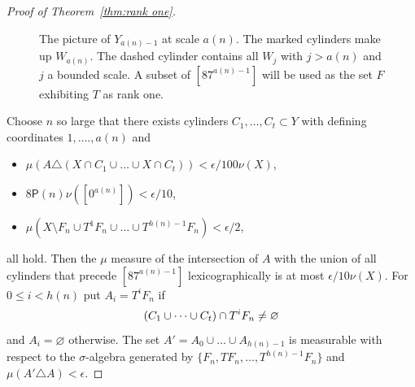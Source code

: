 \documentclass[AHL,Unicode,longabstracts,published]{cedram}
\renewcommand{\P}{\mathsf{P}}
\renewcommand{\emptyset}{\varnothing}
\let\originalleft\left
\let\originalright\right
\renewcommand{\left}{\mathopen{}\mathclose\bgroup\originalleft}
\renewcommand{\right}{\aftergroup\egroup\originalright}
\begin{document}
\begin{proof}[Proof of Theorem~\ref{thm:rank one}]
\begin{figure}[!h]
\caption{The picture of $Y_{a(n)-1}$ at scale $a(n)$. The marked cylinders make up $W_{a(n)}$. The dashed cylinder contains all $W_j$ with $j > a(n)$ and $j$ a bounded scale. A subset of $[87^{a(n)-1}]$ will be used as the set $F$ exhibiting $T$ as rank one.}\label{fig:rank_one}
\end{figure}

\pagebreak
Choose $n$ so large that there exists cylinders $C_1,\dots,C_t\subset Y$ with defining coordinates $1,\dots.,a(n)$ and
\begin{itemize}
\item $\mu (A \triangle (X \cap C_1 \cup \dots \cup X \cap C_t) ) < \epsilon/100 \nu(X)$,
\item $8 \P(n) \nu([0^{a(n)}]) < \epsilon/10$,
\item $\mu(X \setminus F_n \cup T^1 F_n \cup \dots \cup T^{h(n)-1} F_n) < \epsilon/2$,
\end{itemize}
all hold. Then the $\mu$ measure of the intersection of $A$ with the union of all cylinders that precede $[87^{a(n) - 1}]$ lexicographically is at most $\epsilon/10 \nu(X)$. For $0 \le i < h(n)$ put $A_i = T^i F_n$ if
\[
\left(C_1 \cup \dots \cup C_t\right) \cap T^i F_n \ne \emptyset
\]
and $A_i = \emptyset$ otherwise. The set $A' = A_0 \cup \dots \cup A_{h(n)-1}$ is measurable with respect to the $\sigma$-algebra generated by $\{ F_n, T F_n, \dots, T^{h(n)-1} F_n \}$ and $\mu(A' \triangle A) < \epsilon$.
\end{proof}
\end{document}

